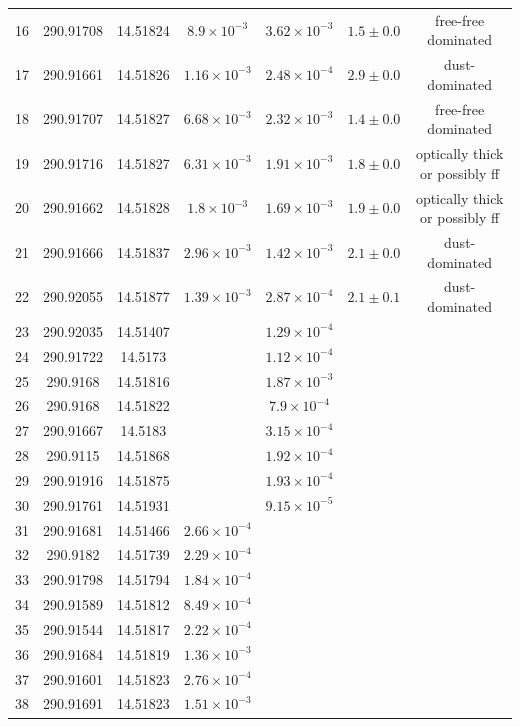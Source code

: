 \begin{table}
\begin{tabular}{ccccccc}
16 & 290.91708 & 14.51824 & $8.9\times10^{-3}$ & $3.62\times10^{-3}$ & $1.5\pm0.0$ & free-free dominated \\
17 & 290.91661 & 14.51826 & $1.16\times10^{-3}$ & $2.48\times10^{-4}$ & $2.9\pm0.0$ & dust-dominated \\
18 & 290.91707 & 14.51827 & $6.68\times10^{-3}$ & $2.32\times10^{-3}$ & $1.4\pm0.0$ & free-free dominated \\
19 & 290.91716 & 14.51827 & $6.31\times10^{-3}$ & $1.91\times10^{-3}$ & $1.8\pm0.0$ & optically thick or possibly ff \\
20 & 290.91662 & 14.51828 & $1.8\times10^{-3}$ & $1.69\times10^{-3}$ & $1.9\pm0.0$ & optically thick or possibly ff \\
21 & 290.91666 & 14.51837 & $2.96\times10^{-3}$ & $1.42\times10^{-3}$ & $2.1\pm0.0$ & dust-dominated \\
22 & 290.92055 & 14.51877 & $1.39\times10^{-3}$ & $2.87\times10^{-4}$ & $2.1\pm0.1$ & dust-dominated \\
23 & 290.92035 & 14.51407 &  & $1.29\times10^{-4}$ &  &  \\
24 & 290.91722 & 14.5173 &  & $1.12\times10^{-4}$ &  &  \\
25 & 290.9168 & 14.51816 &  & $1.87\times10^{-3}$ &  &  \\
26 & 290.9168 & 14.51822 &  & $7.9\times10^{-4}$ &  &  \\
27 & 290.91667 & 14.5183 &  & $3.15\times10^{-4}$ &  &  \\
28 & 290.9115 & 14.51868 &  & $1.92\times10^{-4}$ &  &  \\
29 & 290.91916 & 14.51875 &  & $1.93\times10^{-4}$ &  &  \\
30 & 290.91761 & 14.51931 &  & $9.15\times10^{-5}$ &  &  \\
31 & 290.91681 & 14.51466 & $2.66\times10^{-4}$ &  &  &  \\
32 & 290.9182 & 14.51739 & $2.29\times10^{-4}$ &  &  &  \\
33 & 290.91798 & 14.51794 & $1.84\times10^{-4}$ &  &  &  \\
34 & 290.91589 & 14.51812 & $8.49\times10^{-4}$ &  &  &  \\
35 & 290.91544 & 14.51817 & $2.22\times10^{-4}$ &  &  &  \\
36 & 290.91684 & 14.51819 & $1.36\times10^{-3}$ &  &  &  \\
37 & 290.91601 & 14.51823 & $2.76\times10^{-4}$ &  &  &  \\
38 & 290.91691 & 14.51823 & $1.51\times10^{-3}$ &  &  &  \\

\end{tabular}
\end{table}

